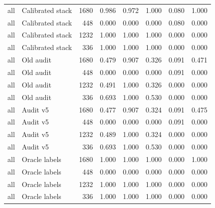 {\begin{longtable}{llrrrrrr}
all & Calibrated stack & 1680 & 0.986 & 0.972 & 1.000 & 0.080 & 1.000 \\
all & Calibrated stack & 448 & 0.000 & 0.000 & 0.000 & 0.080 & 0.000 \\
all & Calibrated stack & 1232 & 1.000 & 1.000 & 1.000 & 0.000 & 0.000 \\
all & Calibrated stack & 336 & 1.000 & 1.000 & 1.000 & 0.000 & 0.000 \\
all & Old audit & 1680 & 0.479 & 0.907 & 0.326 & 0.091 & 0.471 \\
all & Old audit & 448 & 0.000 & 0.000 & 0.000 & 0.091 & 0.000 \\
all & Old audit & 1232 & 0.491 & 1.000 & 0.326 & 0.000 & 0.000 \\
all & Old audit & 336 & 0.693 & 1.000 & 0.530 & 0.000 & 0.000 \\
all & Audit v5 & 1680 & 0.477 & 0.907 & 0.324 & 0.091 & 0.475 \\
all & Audit v5 & 448 & 0.000 & 0.000 & 0.000 & 0.091 & 0.000 \\
all & Audit v5 & 1232 & 0.489 & 1.000 & 0.324 & 0.000 & 0.000 \\
all & Audit v5 & 336 & 0.693 & 1.000 & 0.530 & 0.000 & 0.000 \\
all & Oracle labels & 1680 & 1.000 & 1.000 & 1.000 & 0.000 & 1.000 \\
all & Oracle labels & 448 & 0.000 & 0.000 & 0.000 & 0.000 & 0.000 \\
all & Oracle labels & 1232 & 1.000 & 1.000 & 1.000 & 0.000 & 0.000 \\
all & Oracle labels & 336 & 1.000 & 1.000 & 1.000 & 0.000 & 0.000 \\
\bottomrule
\end{longtable}
}
